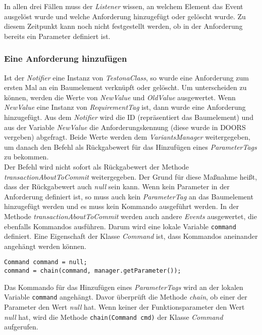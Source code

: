 In allen drei Fällen muss der \textit{Listener} wissen, an welchem Element  das Event ausgelöst wurde und welche Anforderung hinzugefügt oder gelöscht wurde. Zu diesem Zeitpunkt kann noch nicht festgestellt werden, ob in der Anforderung bereits ein Parameter definiert ist.\\


\subsubsection{Eine Anforderung hinzufügen}
Ist der \textit{Notifier} eine Instanz von \textit{TestonaClass}, so wurde eine Anforderung zum ersten Mal an ein Baumelement verknüpft oder gelöscht. Um unterscheiden zu können, werden die Werte von \textit{NewValue} und \textit{OldValue} ausgewertet. Wenn \textit{NewValue} eine Instanz von \textit{RequirementTag} ist, dann wurde eine Anforderung hinzugefügt. Aus dem \textit{Notifier} wird die ID (repräsentiert das Baumelement) und aus der Variable \textit{NewValue} die Anforderungskennung (diese wurde in DOORS vergeben) abgefragt. Beide Werte werden dem \textit{VariantsManager} weitergegeben, um danach den Befehl als Rückgabewert für das Hinzufügen eines \textit{ParameterTags} zu bekommen.\\


Der Befehl wird nicht sofort als Rückgabewert der Methode \textit{transactionAboutToCommit} weitergegeben. Der Grund für diese Maßnahme heißt, dass der Rückgabewert auch \textit{null} sein kann. Wenn kein Parameter in der Anforderung definiert ist, so muss auch kein \textit{ParameterTag} an das Baumelement hinzugefügt werden und es muss kein Kommando ausgeführt werden. In der Methode \textit{transactionAboutToCommit} werden auch andere \textit{Events} ausgewertet, die ebenfalls Kommandos ausführen. Darum wird eine lokale Variable \texttt{command} definiert. Eine Eigenschaft der Klasse \textit{Command} ist, dass Kommandos aneinander angehängt werden können.

\begin{lstlisting}
Command command = null;
command = chain(command, manager.getParameter());
\end{lstlisting}

Das Kommando für das Hinzufügen eines \textit{ParameterTags} wird an der lokalen Variable \texttt{command} angehängt. Davor überprüft die Methode \textit{chain}, ob einer der Parameter den Wert \textit{null} hat. Wenn keiner der Funktionsparameter den Wert \textit{null} hat, wird die Methode \texttt{chain(Command cmd)} der Klasse \textit{Command} aufgerufen.

